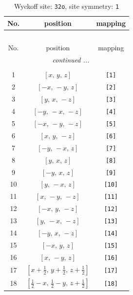 \documentclass[fleqn,8pt]{jsarticle}
\begin{document}
\renewcommand{\arraystretch}{1.2}
\begin{longtable}{ccc}
\caption{Wyckoff site: {\tt 32o}, site symmetry: {\tt 1}}
 \\
 \hline \hline
No. & position & mapping \\ \hline \endfirsthead

\multicolumn{2}{l}{\tablename\ \thetable{}} \\
 \hline \hline
No. & position & mapping \\ \hline \endhead

 \hline \hline
\multicolumn{2}{r}{\footnotesize\it continued ...} \\ \endfoot

 \hline \hline
\multicolumn{2}{r}{} \\ \endlastfoot

1 & $\left[ x,\, y,\, z \right]$ & {\tt [1]} \\ \hline
2 & $\left[ - x,\, - y,\, z \right]$ & {\tt [2]} \\ \hline
3 & $\left[ y,\, x,\, - z \right]$ & {\tt [3]} \\ \hline
4 & $\left[ - y,\, - x,\, - z \right]$ & {\tt [4]} \\ \hline
5 & $\left[ - x,\, - y,\, - z \right]$ & {\tt [5]} \\ \hline
6 & $\left[ x,\, y,\, - z \right]$ & {\tt [6]} \\ \hline
7 & $\left[ - y,\, - x,\, z \right]$ & {\tt [7]} \\ \hline
8 & $\left[ y,\, x,\, z \right]$ & {\tt [8]} \\ \hline
9 & $\left[ - y,\, x,\, z \right]$ & {\tt [9]} \\ \hline
10 & $\left[ y,\, - x,\, z \right]$ & {\tt [10]} \\ \hline
11 & $\left[ x,\, - y,\, - z \right]$ & {\tt [11]} \\ \hline
12 & $\left[ - x,\, y,\, - z \right]$ & {\tt [12]} \\ \hline
13 & $\left[ y,\, - x,\, - z \right]$ & {\tt [13]} \\ \hline
14 & $\left[ - y,\, x,\, - z \right]$ & {\tt [14]} \\ \hline
15 & $\left[ - x,\, y,\, z \right]$ & {\tt [15]} \\ \hline
16 & $\left[ x,\, - y,\, z \right]$ & {\tt [16]} \\ \hline
17 & $\left[ x + \frac{1}{2},\, y + \frac{1}{2},\, z + \frac{1}{2} \right]$ & {\tt [17]} \\ \hline
18 & $\left[ \frac{1}{2} - x,\, \frac{1}{2} - y,\, z + \frac{1}{2} \right]$ & {\tt [18]} \\ \hline

\end{longtable}
\end{document}
